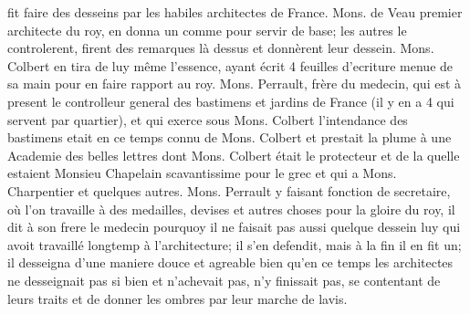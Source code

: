 fit faire des desseins par les habiles architectes de France.\protect{}
Mons. de Veau\protect{}
premier architecte du roy,\protect{}
en donna un comme pour servir de base; les autres le controlerent, firent des remarques l\`{a} dessus et donn\`{e}rent leur dessein.
Mons. Colbert\protect{} en tira de luy même l'essence, ayant \'{e}crit 4 feuilles d'ecriture menue de sa main pour en faire rapport au roy.\protect{}
Mons. Perrault,\protect{}
fr\`{e}re du medecin, qui est à present le controlleur general des bastimens et jardins\protect{} de France\protect{}
(il y en a 4 qui servent par quartier),
et qui exerce sous Mons. Colbert\protect{}
l'intendance des bastimens etait en ce temps connu de Mons. Colbert\protect{}
et prestait la plume à une Academie des belles lettres dont Mons. Colbert\protect{}
\'{e}tait le protecteur et de la quelle estaient
Monsieu Chapelain\protect{}
scavantissime pour le grec et qui a
Mons. Charpentier\protect{} et quelques autres. Mons. Perrault\protect{} y faisant fonction de secretaire, o\`{u} l'on travaille à des medailles, devises et autres choses pour la gloire du roy\protect{}, il dit à son frere le medecin pourquoy il ne faisait pas aussi quelque dessein luy qui avoit travaillé longtemp à l'architecture\protect{}; il s'en defendit, mais à la fin il en fit un; il desseigna d'une maniere douce et agreable bien qu'en ce temps les architectes ne desseignait pas si bien et n'achevait pas, n'y finissait pas, se contentant de leurs traits et de donner les ombres par leur marche de lavis.
